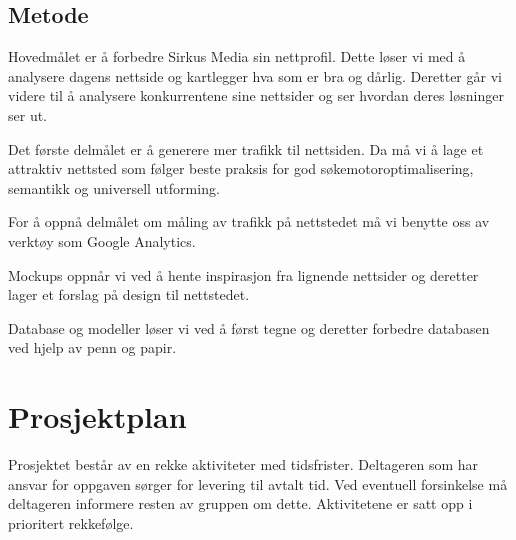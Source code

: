 \documentclass[11pt,a4paper]{report}
\begin{document}
\subsection*{Metode}
Hovedmålet er å forbedre Sirkus Media sin nettprofil. Dette løser vi med å analysere dagens nettside og kartlegger hva som er bra og dårlig. Deretter går vi videre til å analysere konkurrentene sine nettsider og ser hvordan deres løsninger ser ut. 

Det første delmålet er å generere mer trafikk til nettsiden. Da må vi å lage et attraktiv nettsted som følger beste praksis for god søkemotoroptimalisering, semantikk og universell utforming. 

For å oppnå delmålet om måling av trafikk på nettstedet må vi benytte oss av verktøy som Google Analytics. 

Mockups oppnår vi ved å hente inspirasjon fra lignende nettsider og deretter lager et forslag på design til nettstedet.

Database og modeller løser vi ved å først tegne og deretter forbedre databasen ved hjelp av penn og papir. 

\section*{Prosjektplan}

Prosjektet består av en rekke aktiviteter med tidsfrister. Deltageren som har ansvar for oppgaven sørger for levering til avtalt tid. Ved eventuell forsinkelse må deltageren informere resten av gruppen om dette. Aktivitetene er satt opp i prioritert rekkefølge.

\smallskip

\setcounter{aktivitetTeller}{1}
\end{document}

